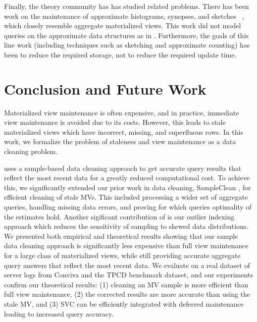 Finally, the theory community has has studied related problems.
There has been work on the maintenance of approximate histograms, synopses, and sketches ~\cite{gibbons1997fast, DBLP:journals/ftdb/CormodeGHJ12}, which closely resemble aggregate materialized views.
This work did not model queries on the approximate data structures as in \svc.
Furthermore, the goals of this line work (including techniques such as sketching and approximate counting) has been to reduce the required storage, not to reduce the required update time.

\vspace{-1em}
\section{Conclusion and Future Work}\label{conclusion}
\vspace{-.3em}
Materialized view maintenance is often expensive, and in practice, immediate view maintenance is avoided due to its costs.
However, this leads to stale materialized views which have incorrect, missing, and superfluous rows.
In this work, we formalize the problem of staleness and view maintenance as a data cleaning problem.

\svc uses a sample-based data cleaning approach to get accurate query results that reflect the most recent data for a greatly reduced computational cost.
To achieve this, we significantly extended our prior work in data cleaning, SampleClean \cite{wang1999sample}, for efficient cleaning of stale MVs. 
This included processing a wider set of aggregate queries, handling missing data errors, and proving for which queries optimality of the estimates hold.
Another sigificant contribution of \svc is our outlier indexing approach which reduces the sensitivity of sampling to skewed data distributions.
We presented both empirical and theoretical results showing that our sample data cleaning approach is significantly less expensive than full view maintenance for a large class of materialized views, while still providing accurate aggregate query answers that reflect the most recent data.
We evaluate \svc on a real dataset of server logs from Conviva and the TPCD benchmark dataset, and our experiments confirm our theoretical results: (1) cleaning an MV sample is more efficient than full view maintenance, (2) the corrected results are more accurate than using the stale MV, and (3) SVC can be efficiently integrated with deferred maintenance leading to increased query accuracy. 

